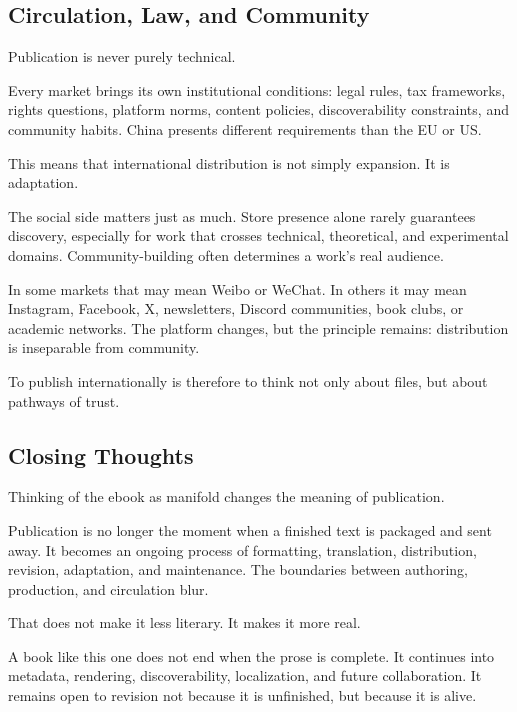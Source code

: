 \hypertarget{circulation-law-and-community}{%
\subsection{Circulation, Law, and
Community}\label{circulation-law-and-community}}

Publication is never purely technical.

Every market brings its own institutional conditions: legal rules, tax
frameworks, rights questions, platform norms, content policies,
discoverability constraints, and community habits. China presents
different requirements than the EU or US.

This means that international distribution is not simply expansion. It
is adaptation.

The social side matters just as much. Store presence alone rarely
guarantees discovery, especially for work that crosses technical,
theoretical, and experimental domains. Community-building often
determines a work's real audience.

In some markets that may mean Weibo or WeChat. In others it may mean
Instagram, Facebook, X, newsletters, Discord communities, book clubs, or
academic networks. The platform changes, but the principle remains:
distribution is inseparable from community.

To publish internationally is therefore to think not only about files,
but about pathways of trust.

\hypertarget{closing-thoughts}{%
\subsection{Closing Thoughts}\label{closing-thoughts}}

Thinking of the ebook as manifold changes the meaning of publication.

Publication is no longer the moment when a finished text is packaged and
sent away. It becomes an ongoing process of formatting, translation,
distribution, revision, adaptation, and maintenance. The boundaries
between authoring, production, and circulation blur.

That does not make it less literary. It makes it more real.

A book like this one does not end when the prose is complete. It
continues into metadata, rendering, discoverability, localization, and
future collaboration. It remains open to revision not because it is
unfinished, but because it is alive.

